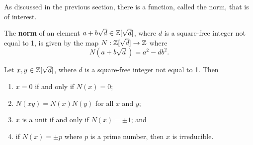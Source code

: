 As discussed in the previous section, there is a function, called the norm, that is of interest.
\begin{definition}
    The \textbf{norm} of an element $a+b\sqrt{d} \in \mathbb{Z}[\sqrt{d}]$, where $d$ is a square-free integer not equal to 1, is given by the map $N: \mathbb{Z}[\sqrt{d}] \to \mathbb{Z}$ where
    \[
        N(a+b\sqrt{d}) = a^2-db^2.
    \]
\end{definition}

\begin{proposition}\label{prop-properties-of-quadratic-integer-norm}
    Let $x,y \in \mathbb{Z}[\sqrt{d}]$, where $d$ is a square-free integer not equal to 1. Then
    \begin{enumerate}
        \item $x = 0$ if and only if $N(x) = 0$;
        \item $N(xy) = N(x)N(y)$ for all $x$ and $y$;
        \item $x$ is a unit if and only if $N(x) = \pm1$; and
        \item if $N(x) = \pm p$ where $p$ is a prime number, then $x$ is irreducible.
    \end{enumerate}
\end{proposition}
